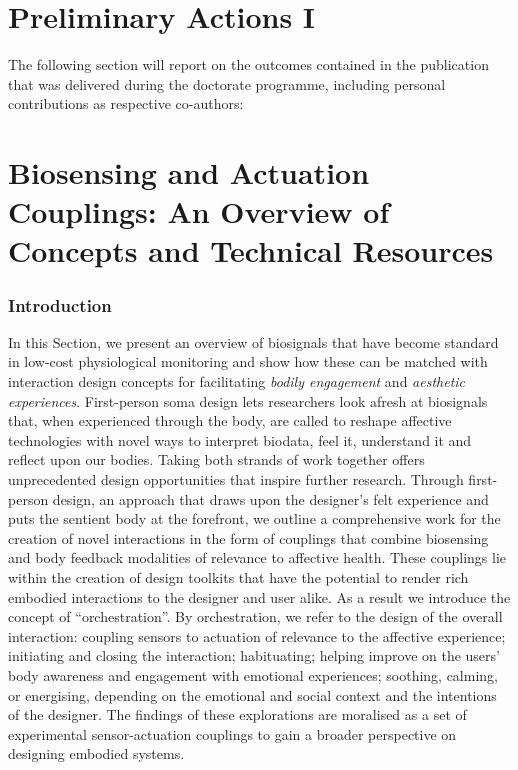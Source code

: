 \section{Preliminary Actions I}
\label{cha:Preliminary_Actions_sens_act}

The following section will report on the outcomes contained in the publication that was delivered during the doctorate programme, including personal contributions as respective co-authors: 



\section{Biosensing and Actuation Couplings: An Overview of Concepts and Technical Resources}

\subsubsection{Introduction}

In this Section, we present an overview of biosignals that have become standard in low-cost physiological monitoring and show how these can be matched with interaction design concepts for facilitating \textit{bodily engagement} and \textit{aesthetic experiences}. First-person soma design lets researchers look afresh at biosignals that, when experienced through the body, are called to reshape affective technologies with novel ways to interpret biodata, feel it, understand it and reflect upon our bodies. Taking both strands of work together offers unprecedented design opportunities that inspire further research. Through first-person design, an approach that draws upon the designer’s felt experience and puts the sentient body at the forefront, we outline a comprehensive work for the creation of novel interactions in the form of couplings that combine biosensing and body feedback modalities of relevance to affective health. These couplings lie within the creation of design toolkits that have the potential to render rich embodied interactions to the designer and user alike. As a result we introduce the concept of “orchestration”. By orchestration, we refer to the design of the overall interaction: coupling sensors to actuation of relevance to the affective experience; initiating and closing the interaction; habituating; helping improve on the users’ body awareness and engagement with emotional experiences; soothing, calming, or energising, depending on the emotional and social context and the intentions of the designer. The findings of these explorations are moralised as a set of experimental sensor-actuation couplings to gain a broader perspective on designing embodied systems.

